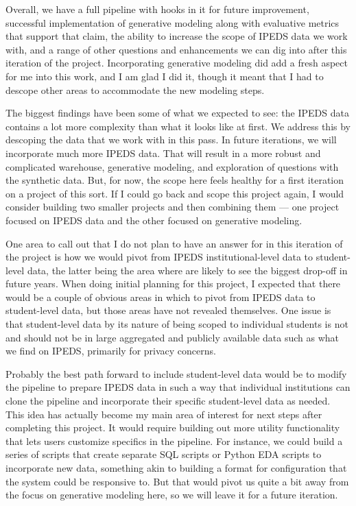 \documentclass[sigconf, authorversion, nonacm]{acmart}
\begin{document}
    Overall, we have a full pipeline with hooks in it for future improvement, successful implementation of generative modeling along with evaluative metrics that support that claim, the ability to increase the scope of IPEDS data we work with, and a range of other questions and enhancements we can dig into after this iteration of the project. Incorporating generative modeling did add a fresh aspect for me into this work, and I am glad I did it, though it meant that I had to descope other areas to accommodate the new modeling steps.

    The biggest findings have been some of what we expected to see: the IPEDS data contains a lot more complexity than what it looks like at first. We address this by descoping the data that we work with in this pass. In future iterations, we will incorporate much more IPEDS data. That will result in a more robust and complicated warehouse, generative modeling, and exploration of questions with the synthetic data. But, for now, the scope here feels healthy for a first iteration on a project of this sort. If I could go back and scope this project again, I would consider building two smaller projects and then combining them --- one project focused on IPEDS data and the other focused on generative modeling.

    One area to call out that I do not plan to have an answer for in this iteration of the project is how we would pivot from IPEDS institutional-level data to student-level data, the latter being the area where are likely to see the biggest drop-off in future years. When doing initial planning for this project, I expected that there would be a couple of obvious areas in which to pivot from IPEDS data to student-level data, but those areas have not revealed themselves. One issue is that student-level data by its nature of being scoped to individual students is not and should not be in large aggregated and publicly available data such as what we find on IPEDS, primarily for privacy concerns.

    Probably the best path forward to include student-level data would be to modify the pipeline to prepare IPEDS data in such a way that individual institutions can clone the pipeline and incorporate their specific student-level data as needed. This idea has actually become my main area of interest for next steps after completing this project. It would require building out more utility functionality that lets users customize specifics in the pipeline. For instance, we could build a series of scripts that create separate SQL scripts or Python EDA scripts to incorporate new data, something akin to building a format for configuration that the system could be responsive to. But that would pivot us quite a bit away from the focus on generative modeling here, so we will leave it for a future iteration.
\end{document}
